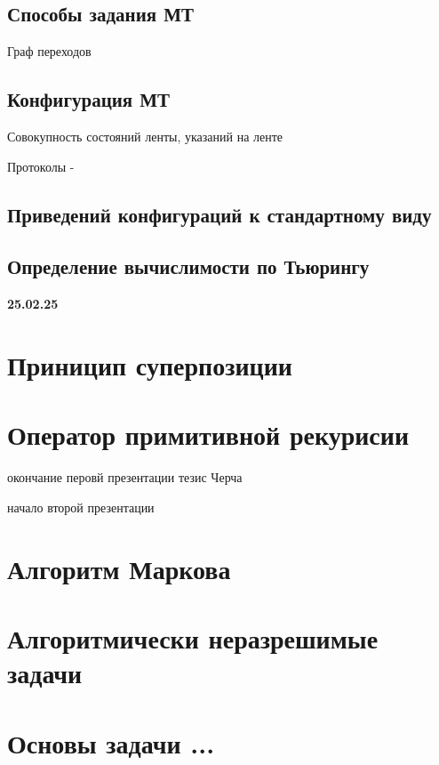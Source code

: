\documentclass{article}
\begin{document}
\subsection{Способы задания МТ}

    Граф переходов

    \subsection{Конфигурация МТ}

    Совокупность состояний ленты, указаний на ленте

    Протоколы - 

    \subsection{Приведений конфигураций к стандартному виду}

    \subsection{Определение вычислимости по Тьюрингу}




\vspace{10mm}

\textbf{25.02.25}

\section{Приницип суперпозиции}

\section{Оператор примитивной рекурисии}


окончание перовй презентации тезис Черча

начало второй презентации

\section{Алгоритм Маркова}



\section{Алгоритмически неразрешимые задачи}


\section{Основы задачи ... }
\end{document}
